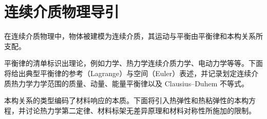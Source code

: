 \documentclass[../main.tex]{subfiles}
\begin{document}
\chapter{连续介质物理导引}\label{chapter:ch02-连续介质物理导引}

在连续介质物理中，物体被建模为连续介质，其运动与平衡由平衡律和本构关系所支配。

平衡律的清单标识出理论，例如力学、热力学连续介质力学、电动力学等等。下面将给出典型平衡律的参考（Lagrange）与空间（Euler）表述，并记录划定连续介质热力学力学范围的质量、动量、能量平衡律以及 Clausius--Duhem 不等式。

本构关系的类型编码了材料响应的本质。下面将引入热弹性和热粘弹性的本构方程，并讨论热力学第二定律、材料标架无差异原理和材料对称性所施加的限制。










\end{document}
